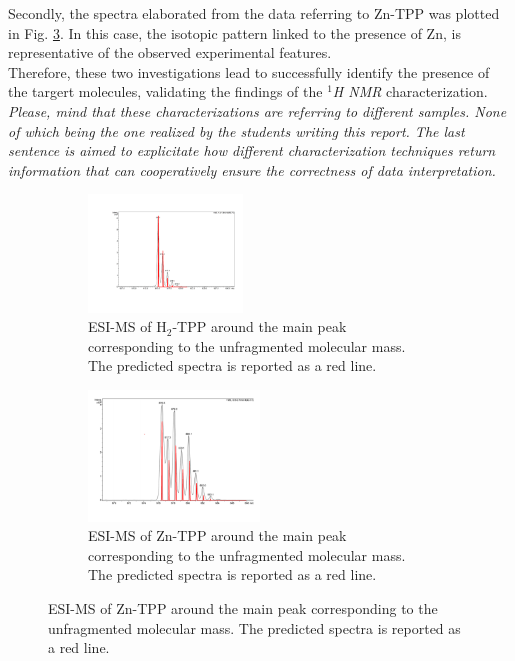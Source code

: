 \documentclass[num-refs]{wiley-article}
\begin{document}
Secondly, the spectra elaborated from the data referring to Zn-TPP was plotted in Fig. \ref{ESI-MS-Zn-TPP}.
In this case, the isotopic pattern linked to the presence of Zn, is representative of the observed experimental features.\\
Therefore, these two investigations lead to successfully identify the presence of the targert molecules, validating the findings of the \textit{$^{1}$H NMR} characterization.
\textit{Please, mind that these characterizations are referring to different samples. None of which being the one realized by the students writing this report.
The last sentence is aimed to explicitate how different characterization techniques return information that can cooperatively ensure the correctness of data interpretation.}
\begin{figure}
    \centering
    \begin{subfigure}
        \centering
        \includegraphics[width=0.45\textwidth]{ESI-MS-H2-TPP}
        \caption{ESI-MS of H$_{2}$-TPP around the main peak corresponding to the unfragmented molecular mass. The predicted spectra is reported as a red line.}
        \label{ESI-MS-H2-TPP}
    \end{subfigure}
    \begin{subfigure}
        \centering
        \includegraphics[width=0.5\textwidth]{ESI-MS-Zn-TPP}
        \caption{ESI-MS of Zn-TPP around the main peak corresponding to the unfragmented molecular mass. The predicted spectra is reported as a red line.}
        \label{ESI-MS-Zn-TPP}
    \end{subfigure}
\end{figure}
\end{document}
